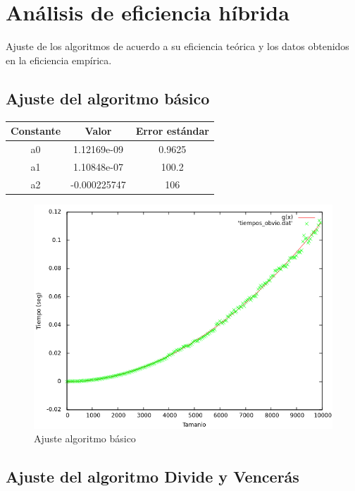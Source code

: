 \documentclass{article}
\begin{document}
	\section{Análisis de eficiencia híbrida}
	Ajuste de los algoritmos de acuerdo a su eficiencia teórica y los datos obtenidos en la eficiencia empírica.
	
	\subsection{Ajuste del algoritmo básico}
	
	\begin{longtable}{|c|c|c|}
		\hline
		Constante		& Valor			& Error estándar	\\ \hline
		a0              & 1.12169e-09	& 0.9625 \\ \hline
		a1              & 1.10848e-07	& 100.2	 \\ \hline
		a2              & -0.000225747	& 106	 \\ \hline
	\end{longtable}
	
	\begin{figure}[H]
		\centering
		\includegraphics[totalheight=8cm]{img/Basico_ajustada}
		\caption{Ajuste algoritmo básico}
		\label{fig:Basico_ajustada}
	\end{figure}
	
	\subsection{Ajuste del algoritmo Divide y Vencerás}
	
\end{document}
